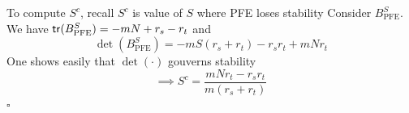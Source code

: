 \documentclass[aspectratio=169]{beamer}
\begin{document}
\begin{frame}	
	To compute $S^c$, recall $S^c$ is value of $S$ where PFE loses stability
	\vfill
	Consider $B_{\textrm{PFE}}^S$. We have $\mathsf{tr}(B_{\textrm{PFE}}^S) = -mN +r_s-r_t$ and
	\[
		\det(B_{\textrm{PFE}}^S) = -mS(r_s+r_t) - r_sr_t  + mNr_t
	\]
	\vfill
	One shows easily that $\det(\cdot)$ gouverns stability
	\vfill
	\[
		\implies S^c = \frac{mNr_t-r_sr_t}{m(r_s+r_t)}
	\]
	\flushright$\square$
\end{frame}




\end{document}
